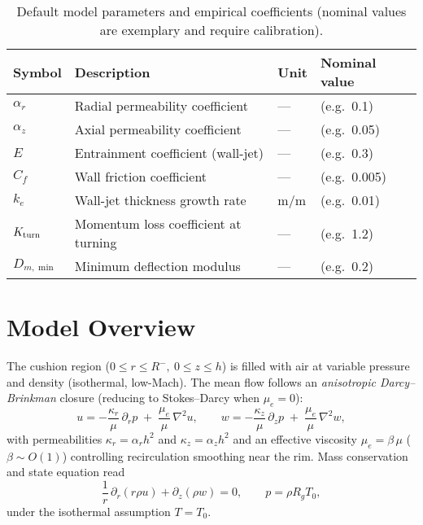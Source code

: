\documentclass[11pt,a4paper]{article}
\begin{document}
\begin{table}[h]
  \centering
  \caption{Default model parameters and empirical coefficients (nominal values are exemplary and require calibration).}
  \label{tab:model-params}
  \begin{tabular}{@{}llll@{}}
    \toprule
    Symbol & Description & Unit & Nominal value \\
    \midrule
    $\alpha_r$     & Radial permeability coefficient      & —     & (e.g.\ 0.1) \\
    $\alpha_z$     & Axial permeability coefficient       & —     & (e.g.\ 0.05) \\
    $E$            & Entrainment coefficient (wall-jet)  & —     & (e.g.\ 0.3) \\
    $C_f$          & Wall friction coefficient           & —     & (e.g.\ 0.005) \\
    $k_e$          & Wall-jet thickness growth rate      & m/m   & (e.g.\ 0.01) \\
    $K_{\rm turn}$ & Momentum loss coefficient at turning& —     & (e.g.\ 1.2) \\
    $D_{m,\min}$   & Minimum deflection modulus         & —     & (e.g.\ 0.2) \\
    \bottomrule
  \end{tabular}
\end{table}


\section{Model Overview}
\label{sec:model-overview}

The cushion region ($0\le r\le R^{-},\ 0\le z\le h$) is filled with air at variable pressure and density (isothermal, low-Mach). 
The mean flow follows an \emph{anisotropic Darcy--Brinkman} closure (reducing to Stokes--Darcy when $\mu_e\!=\!0$):
\begin{equation}
  u = -\frac{\kappa_r}{\mu}\,\partial_r p \;+\; \frac{\mu_e}{\mu}\,\nabla^2 u,
  \qquad
  w = -\frac{\kappa_z}{\mu}\,\partial_z p \;+\; \frac{\mu_e}{\mu}\,\nabla^2 w,
  \label{eq:darcy_brinkman}
\end{equation}
with permeabilities $\kappa_r=\alpha_r h^2$ and $\kappa_z=\alpha_z h^2$ and an effective viscosity $\mu_e=\beta\,\mu$ ($\beta\sim O(1)$) controlling recirculation smoothing near the rim. 
Mass conservation and state equation read
\begin{equation}
  \frac{1}{r}\,\partial_r\!\left(r\rho u\right)+\partial_z(\rho w)=0,
  \qquad
  p=\rho R_g T_0,
\end{equation}
under the isothermal assumption $T=T_0$.
\end{document}
